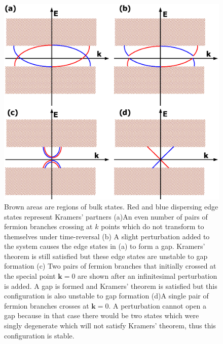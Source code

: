 \documentclass{article}
\begin{document}
\begin{figure}[h]
\centering
\includegraphics[scale=0.45]{80608Fig05.eps}
\caption{Brown areas are regions of bulk states. Red and blue
dispersing edge states represent Kramers' partners (a)An even number
of pairs of fermion branches crossing at $k$ points which do not
transform to themselves under time-reversal (b) A slight
perturbation added to the system causes the edge states in (a) to
form a gap. Kramers' theorem is still satisfied but these edge
states are unstable to gap formation (c) Two pairs of fermion
branches that initially crossed at the special point
${\textbf{k}}=0$ are shown after an infinitesimal perturbation is
added. A gap is formed and Kramers' theorem is satisfied but this
configuration is also unstable to gap formation (d)A single pair of
fermion branches crosses at ${\textbf{k}}=0$. A perturbation cannot
open a gap because in that case there would be two states which were
singly degenerate which will not satisfy Kramers' theorem, thus this
configuration is stable. } \label{edgegapschem}
\end{figure}
\end{document}
